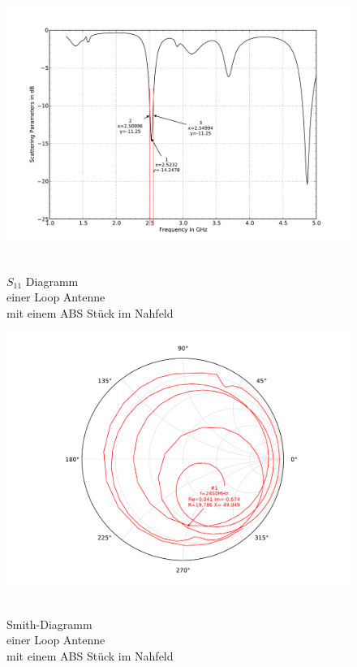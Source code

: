 \begin{figure}[!ht]
\begin{center}
  \includegraphics[width=\linewidth]{content/bilder/Evaluation/Loop/mit1ABS/S11_Loop_Coil_1ABS.pdf}
  \caption{\\$S_{11}$ Diagramm \\einer Loop Antenne \\mit einem ABS Stück im Nahfeld}\label{fig:S11_Loop_1ABS_3}
\endminipage%
{}
  \includegraphics[width=\linewidth]{content/bilder/Evaluation/Loop/mit1ABS/Smith_Loop_Coil_1ABS.pdf}
  \caption{\\Smith-Diagramm \\einer Loop Antenne \\ mit einem ABS Stück im Nahfeld}\label{fig:Smith_Loop_1ABS_4}
\endminipage
\end{center}
\end{figure}
